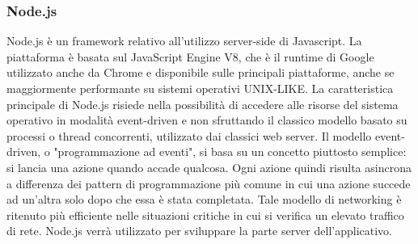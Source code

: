\subsubsection{Node.js}
Node.js è un framework relativo all'utilizzo server-side di Javascript.
La piattaforma è basata sul JavaScript Engine V8, che è il runtime di Google utilizzato anche da Chrome e disponibile sulle principali piattaforme, anche se maggiormente performante su sistemi operativi UNIX-LIKE.
La caratteristica principale di Node.js risiede nella possibilità di accedere alle risorse del sistema operativo in modalità event-driven e non sfruttando il classico modello basato su processi o thread concorrenti, utilizzato dai classici web server.
Il modello event-driven, o "programmazione ad eventi", si basa su un concetto piuttosto semplice: si lancia una azione quando accade qualcosa. Ogni azione quindi risulta asincrona a differenza dei pattern di programmazione più comune in cui una azione succede ad un'altra solo dopo che essa è stata completata.
Tale modello di networking è ritenuto più efficiente nelle situazioni critiche in cui si verifica un elevato traffico di rete.
Node.js verrà utilizzato per sviluppare la parte server dell'applicativo.



